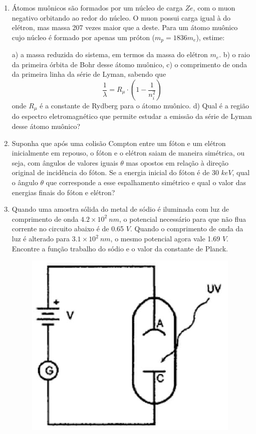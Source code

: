 \begin{enumerate}[start=1,label={\bfseries Q\arabic*.}]
\item Átomos muônicos são formados por um núcleo de carga $Ze$, com o muon negativo orbitando ao redor do núcleo. O muon possui carga igual à do elétron, mas massa 207 vezes maior que a deste. Para um átomo muônico cujo núcleo é formado por apenas um próton ($m_{p} = 1836 m_{e}$), estime:

a) a massa reduzida do sistema, em termos da massa do elétron $m_{e}$.
b) o raio da primeira órbita de Bohr desse átomo muônico,
c) o comprimento de onda da primeira linha da série de Lyman, sabendo que
$$
\frac{1}{\lambda} = R_{\mu} \cdot \left(  1 - \frac{1}{n_{i}^{2}}  \right)
$$
onde $R_{\mu}$ é a constante de Rydberg para o átomo muônico.
d) Qual é a região do espectro eletromagnético que permite estudar a emissão da série de Lyman desse átomo muônico?




\item Suponha que após uma colisão Compton entre um fóton e um elétron inicialmente em repouso, o fóton e o elétron saiam de maneira simétrica, ou seja, com ângulos de valores iguais $\theta$  mas opostos em relação à direção original de incidência do fóton. Se a energia inicial do fóton é de 30 $keV$, qual o ângulo $\theta$ que corresponde a esse espalhamento simétrico e qual o valor das energias finais do fóton e elétron?


\item Quando uma amostra sólida do metal de sódio é iluminada com luz de comprimento de onda $4.2 \times 10^{2} \ nm$, o potencial necessário para que não flua corrente no circuito abaixo é de 0.65 $V$. Quando o comprimento de onda da luz é alterado para $3.1 \times 10^{2} \ nm$, o mesmo potencial agora vale 1.69 $V$. Encontre a função trabalho do sódio e o valor da constante de Planck.
\begin{figure}[H]
\centering
\includegraphics[scale=0.8]{moderna-img/sodio.png}
\end{figure}



\end{enumerate}
